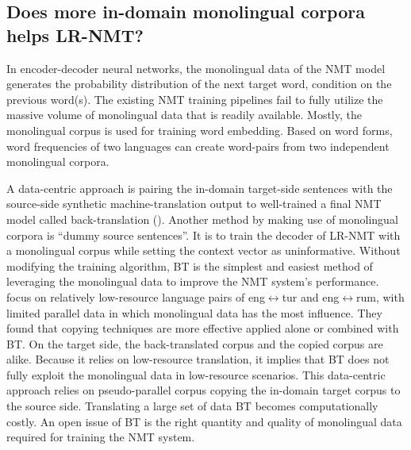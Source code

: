\documentclass[manuscript,screen]{acmart}
\begin{document}
\subsection{Does more in-domain monolingual corpora helps LR-NMT?}
In encoder-decoder neural networks, the monolingual data of the NMT model generates the probability distribution of the next target word, condition on the previous word(s). The existing NMT training pipelines fail to fully utilize the massive volume of monolingual data that is readily available. Mostly, the monolingual corpus is used for training word embedding. Based on word forms, word frequencies of two languages can create word-pairs from two independent monolingual corpora.
   
A data-centric approach is pairing the in-domain target-side sentences with the source-side synthetic machine-translation output to well-trained a final NMT model called back-translation (\citet{sennrich2016improving}). Another method by making use of monolingual corpora is ``dummy source sentences''. It is to train the decoder of LR-NMT with a monolingual corpus while setting the context vector as uninformative. Without modifying the training algorithm, BT is the simplest and easiest method of leveraging the monolingual data to improve the NMT system's performance. 
\citet{currey2017copied} focus on relatively low-resource language pairs of eng$\leftrightarrow$tur and eng$\leftrightarrow$rum, with limited parallel data in which monolingual data has the most influence. They found that copying techniques are more effective applied alone or combined with BT. On the target side, the back-translated corpus and the copied corpus are alike. Because it relies on low-resource translation, it implies that BT does not fully exploit the monolingual data in low-resource scenarios. This data-centric approach relies on pseudo-parallel corpus copying the in-domain target corpus to the source side. Translating a large set of data BT becomes computationally costly. An open issue of BT is the right quantity and quality of monolingual data required for training the NMT system. 
\end{document}

